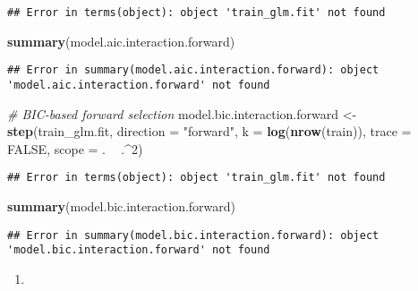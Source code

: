 \documentclass[]{article}
\newenvironment{Shaded}{\begin{snugshade}}{\end{snugshade}}
\newcommand{\CommentTok}[1]{\textcolor[rgb]{0.56,0.35,0.01}{\textit{#1}}}
\newcommand{\DataTypeTok}[1]{\textcolor[rgb]{0.13,0.29,0.53}{#1}}
\newcommand{\DecValTok}[1]{\textcolor[rgb]{0.00,0.00,0.81}{#1}}
\newcommand{\KeywordTok}[1]{\textcolor[rgb]{0.13,0.29,0.53}{\textbf{#1}}}
\newcommand{\NormalTok}[1]{#1}
\newcommand{\OperatorTok}[1]{\textcolor[rgb]{0.81,0.36,0.00}{\textbf{#1}}}
\newcommand{\OtherTok}[1]{\textcolor[rgb]{0.56,0.35,0.01}{#1}}
\newcommand{\StringTok}[1]{\textcolor[rgb]{0.31,0.60,0.02}{#1}}
\begin{document}
\begin{verbatim}
## Error in terms(object): object 'train_glm.fit' not found
\end{verbatim}

\begin{Shaded}
\begin{Highlighting}[]
\KeywordTok{summary}\NormalTok{(model.aic.interaction.forward)}
\end{Highlighting}
\end{Shaded}

\begin{verbatim}
## Error in summary(model.aic.interaction.forward): object 'model.aic.interaction.forward' not found
\end{verbatim}

\begin{Shaded}
\begin{Highlighting}[]
\CommentTok{# BIC-based forward selection}
\NormalTok{model.bic.interaction.forward <-}\StringTok{ }\KeywordTok{step}\NormalTok{(train_glm.fit, }\DataTypeTok{direction =} \StringTok{"forward"}\NormalTok{, }\DataTypeTok{k =} \KeywordTok{log}\NormalTok{(}\KeywordTok{nrow}\NormalTok{(train)), }
                                      \DataTypeTok{trace =} \OtherTok{FALSE}\NormalTok{, }\DataTypeTok{scope =}\NormalTok{ . }\OperatorTok{~}\StringTok{ }\NormalTok{.}\OperatorTok{^}\DecValTok{2}\NormalTok{)}
\end{Highlighting}
\end{Shaded}

\begin{verbatim}
## Error in terms(object): object 'train_glm.fit' not found
\end{verbatim}

\begin{Shaded}
\begin{Highlighting}[]
\KeywordTok{summary}\NormalTok{(model.bic.interaction.forward)}
\end{Highlighting}
\end{Shaded}

\begin{verbatim}
## Error in summary(model.bic.interaction.forward): object 'model.bic.interaction.forward' not found
\end{verbatim}

\begin{enumerate}
\def\labelenumi{(\alph{enumi})}
\setcounter{enumi}{3}
\item
\end{enumerate}
\end{document}
